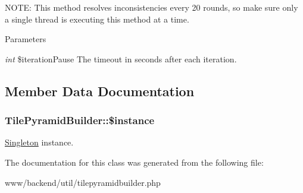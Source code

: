 NOTE: This method resolves inconsistencies every 20 rounds, so make sure only a single thread is executing this method at a time.


\begin{DoxyParams}{Parameters}
\item[{\em int}]\$iterationPause The timeout in seconds after each iteration. \end{DoxyParams}


\subsection{Member Data Documentation}
\hypertarget{classTilePyramidBuilder_ae07c9ce1d0788ab44fc9ff0f3a18442e}{
\subsubsection[{\$instance}]{\setlength{\rightskip}{0pt plus 5cm}TilePyramidBuilder::\$instance}}
\label{classTilePyramidBuilder_ae07c9ce1d0788ab44fc9ff0f3a18442e}
\hyperlink{classSingleton}{Singleton} instance. 

The documentation for this class was generated from the following file:\begin{DoxyCompactItemize}
\item 
www/backend/util/tilepyramidbuilder.php\end{DoxyCompactItemize}

